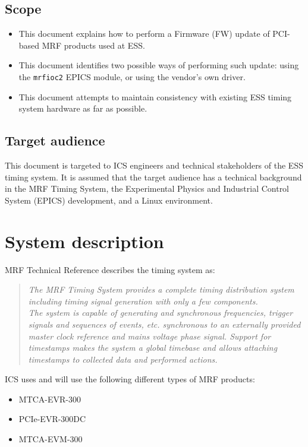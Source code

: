 \documentclass[11pt
  , a4paper
  , article
  , oneside
  , showtrims
]{memoir}
\begin{document}
\section{Scope}
\begin{itemize}
\item This document explains how to perform a Firmware (FW) update of PCI-based MRF products used at ESS.
\item This document identifies two possible ways of performing such update: using the \texttt{mrfioc2} EPICS module, or using the vendor's own driver.
\item This document attempts to maintain consistency with existing ESS timing system hardware as far as possible.
\end{itemize}

\section{Target audience}
This document is targeted to ICS engineers and technical stakeholders of the ESS timing system. It is assumed that the target audience has a technical background in the MRF Timing System, the Experimental Physics and Industrial Control System (EPICS) development, and a Linux environment.\\

\chapter{System description}
MRF Technical Reference \citep[see][p5]{MRFEVENTSYSTEMDC} describes the timing system as:
\blockquote{\textit{The MRF Timing System provides a complete timing distribution system including timing signal generation with only a few components.\\The system is capable of generating and synchronous frequencies, trigger signals and sequences of events, etc. synchronous to an externally provided master clock reference and mains voltage phase signal. Support for timestamps makes the system a global timebase and allows attaching timestamps to collected data and performed actions.}}

ICS uses and will use the following different types of MRF products:
\begin{itemize}
\item MTCA-EVR-300
\item PCIe-EVR-300DC
\item MTCA-EVM-300
\end{itemize}
\end{document}

